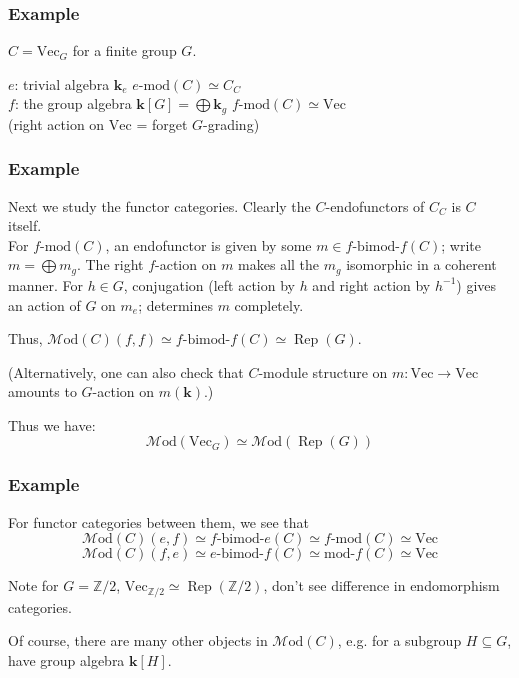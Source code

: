 \documentclass{beamer}
\newcommand{\kk}{{\mathbf{k}}}
\newcommand{\ZZ}{{\mathbb{Z}}}
\DeclareMathOperator{\Rep}{Rep}
\newcommand{\inv}{{-1}} %
\newcommand{\Vect}{{\textrm{Vec}}}
\newcommand{\bimod}[2]{{#1\textrm{-bimod-}#2}}
\newcommand{\amod}[1]{{#1\textrm{-mod}}}
\newcommand{\moda}[1]{{\textrm{mod-}#1}}
\newcommand{\Mod}{{\mathcal{M}\textrm{od}}}
\newcommand{\ModA}[1]{{\Mod(#1)}}
\begin{document}
\begin{frame}
\frametitle{Example}

$C = \Vect_{G}$ for a finite group $G$.

\pause
$e$: trivial algebra $\kk_e$
\;\;\;
$\amod{e}(C) \simeq C_C$
\\
\pause
$f$: the group algebra $\kk[G] = \bigoplus \kk_g$
\;\;\;
$\amod{f}(C) \simeq \Vect$\\
(right action on $\Vect$ = forget $G$-grading)

\end{frame}

\begin{frame}
\frametitle{Example}

Next we study the functor categories.
Clearly the $C$-endofunctors of $C_C$ is $C$ itself.
\\
\pause
For $\amod{f}(C)$,
an endofunctor is given by some $m \in \bimod{f}{f}(C)$;
write $m = \bigoplus m_g$.
\pause
The right $f$-action on $m$ makes all the $m_g$ isomorphic
in a coherent manner.
\pause
For $h \in G$, conjugation (left action by $h$ and right action
by $h^\inv$) gives an action of $G$ on $m_e$;
determines $m$ completely.

\pause
Thus, $\ModA{C}(f,f) \simeq \bimod{f}{f}(C) \simeq \Rep(G)$.

\pause

(Alternatively, one can also check that $C$-module structure on
$m: \Vect \to \Vect$
amounts to $G$-action on $m(\kk)$.)
\pause

Thus we have:
\[
\ModA{\Vect_G} \simeq \ModA{\Rep(G)}
\]

\end{frame}

\begin{frame}
\frametitle{Example}

For functor categories between them, we see that
\[
\ModA{C}(e,f) \simeq \bimod{f}{e}(C) \simeq \amod{f}(C)
\simeq \Vect
\]
\[
\ModA{C}(f,e) \simeq \bimod{e}{f}(C) \simeq \moda{f}(C)
\simeq \Vect
\]

\pause
Note for $G = \ZZ/2$,
$\Vect_{\ZZ/2} \simeq \Rep(\ZZ/2)$,
don't see difference in endomorphism categories.

\pause
Of course, there are many other objects in $\ModA{C}$,
e.g. for a subgroup $H \subseteq G$,
have group algebra $\kk[H]$.

\end{frame}
\end{document}
